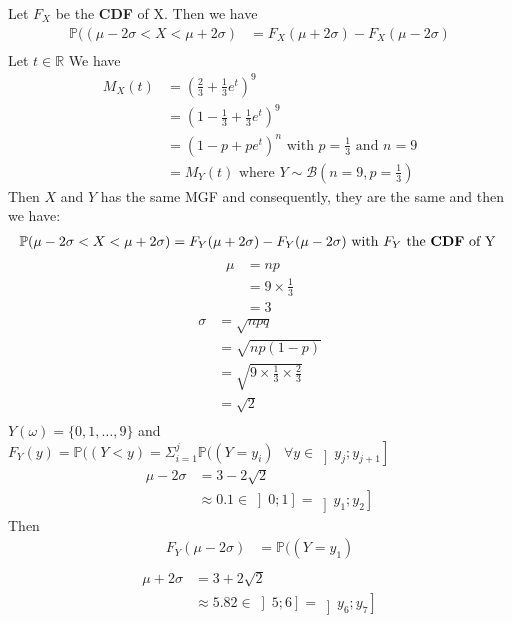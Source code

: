 \documentclass[11pt]{article}
\def\lt{<}
\begin{document}
Let $F_X$ be the \textbf{CDF} of X. Then we have
\begin{align*}
\mathbb {P}((\mu -2\sigma \lt  X \lt \mu+2\sigma) &= F_X(\mu+2\sigma)-F_X(\mu -2\sigma) \\
\end{align*}
Let $t\in \mathbb{R}$
We have
\begin{align*}
M_X(t) &=(\frac{2}{3}+\frac{1}{3}e^t)^9 \\
       &=(1-\frac{1}{3}+\frac{1}{3}e^t)^9 \\
       &=(1-p+pe^t)^n \text{ with } p=\frac{1}{3} \text{ and } n=9\\
       &=M_Y(t)\text{ where } Y \sim \mathcal B(n=9,p=\frac{1}{3})
\end{align*} 
Then $X$ and $Y$ has the same MGF and consequently, they are the same and then we have:
\begin{align*}
\mathbb {P}(\mu -2\sigma \lt  X \lt \mu+2\sigma) &= F_Y(\mu+2\sigma)-F_Y(\mu -2\sigma) \text{ with } F_Y \text{ the \textbf{CDF} of Y } \\
\end{align*}
\begin{align*}
\mu &= np\\
    &= 9\times \frac{1}{3}\\
    &=3
\end{align*}
\begin{align*}
\sigma &= \sqrt{npq} \\
       &= \sqrt{np(1-p)} \\ 
       &= \sqrt{9\times \frac{1}{3}\times \frac{2}{3}} \\ 
       &= \sqrt{2} \\          
\end{align*}
$Y(\omega)=\{0, 1, \ldots, 9\}$ and
 $F_Y(y)=\mathbb {P}((Y\lt y)=\Sigma_{i=1}^{j}{ \mathbb {P}((Y=y_i)}   \textbf{ } \forall  y\in \left]y_j ; y_{j+1}\right] $
\begin{align*}
\mu -2\sigma &= 3-2\sqrt{2} \\
       &\approx 0.1 \in \left]0 ; 1\right]=\left]y_1 ; y_2\right]         
\end{align*}
Then 
\begin{align*}
F_Y(\mu -2\sigma) &= \mathbb {P}((Y=y_1) \\           
\end{align*}
\begin{align*}
\mu +2\sigma &= 3+2\sqrt{2} \\
       &\approx 5.82 \in \left]5 ; 6\right]=\left]y_6 ; y_7\right] \\          
\end{align*}
\end{document}
